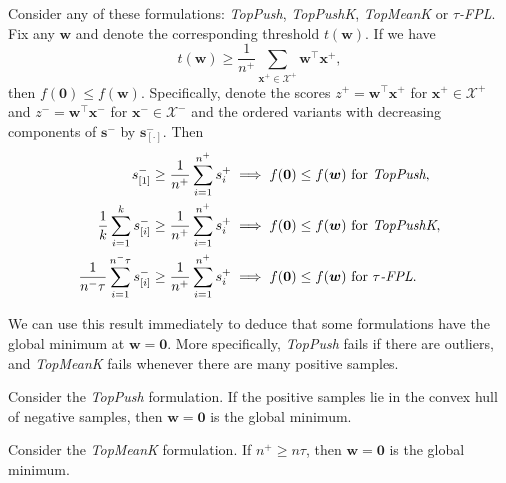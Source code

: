 \documentclass{Thesis}
\newcommand{\Xc}{\mathcal{X}}
\newcommand{\TopPush}{\emph{TopPush}\xspace}
\newcommand{\TopPushK}{\emph{TopPushK}\xspace}
\newcommand{\tauFPL}{{\emph{$\tau$-FPL}}\xspace}
\newcommand{\TopMeanK}{\emph{TopMeanK}\xspace}
\begin{document}
\begin{theorem}\label{thm:large_t}
  Consider any of these formulations: \TopPush, \TopPushK, \TopMeanK or \tauFPL. Fix any $\bm{w}$ and denote the corresponding threshold $t(\bm{w})$. If we have
  \begin{equation*}
    t(\bm{w})\ge \frac{1}{n^+} \sum_{\bm{x}^+ \in \Xc^+} \bm{w}^\top \bm{x}^+,
  \end{equation*}
  then $f(\bm{0})\le f(\bm{w})$. Specifically, denote the scores $z^+=\bm{w}^\top \bm{x}^+$ for $\bm{x}^+\in\Xc^+$ and $z^-=\bm{w}^\top \bm{x}^-$ for $\bm{x}^-\in\Xc^-$ and the ordered variants with decreasing components of $\bm{s}^-$ by $\bm{s}_{[\cdot]}^-$. Then
  \begin{equation}\label{eq:w_zero}
    \begin{aligned}
    s_{[1]}^- \ge \frac{1}{n^+} \sum_{i=1}^{n^+} s_{i}^+
    & \implies f(\bm{0}) \le f(\bm{w}) \text{ for } \TopPush, \\
    \frac{1}{k}\sum_{i=1}^k s_{[i]}^- \ge \frac{1}{n^+} \sum_{i=1}^{n^+} s_{i}^+
    & \implies f(\bm{0})\le f(\bm{w}) \text{ for } \TopPushK, \\
    \frac{1}{n^-\tau} \sum_{i=1}^{n^-\tau} s_{[i]}^- \ge \frac{1}{n^+}\sum_{i=1}^{n^+} s_{i}^+
    & \implies f(\bm{0}) \le f(\bm{w}) \text{ for } \tauFPL. \\
    \end{aligned}
  \end{equation}
\end{theorem}

We can use this result immediately to deduce that some formulations have the global minimum at $\bm{w} = \bm{0}$. More specifically, \TopPush fails if there are outliers, and \TopMeanK fails whenever there are many positive samples.

\begin{corollary}\label{cor:toppush}
  Consider the \TopPush formulation. If the positive samples lie in the convex hull of negative samples, then $\bm{w}=\bm{0}$ is the global minimum.
\end{corollary}

\begin{corollary}\label{cor:topmean}
  Consider the \TopMeanK formulation. If $n^+\ge n\tau$, then $\bm{w}=\bm{0}$ is the global minimum.
\end{corollary}
\end{document}
